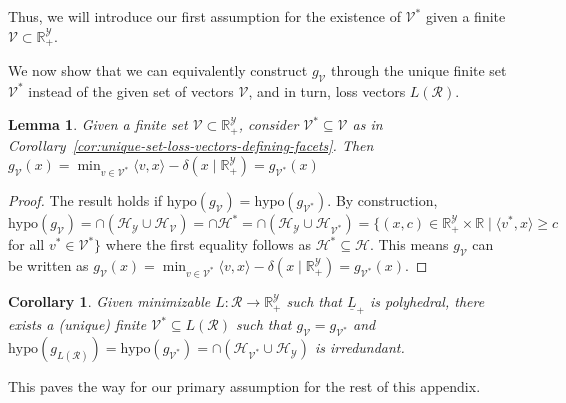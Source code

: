 \documentclass[11pt]{article}
\newcommand{\reals}{\mathbb{R}}
\renewcommand{\H}{\mathcal{H}}
\newcommand{\R}{\mathcal{R}}
\newcommand{\V}{\mathcal{V}}
\newcommand{\Y}{\mathcal{Y}}
\newcommand{\risk}[1]{\underline{#1}}
\newcommand{\inprod}[2]{\langle #1, #2 \rangle}%
\newcommand{\hyp}{\mathrm{hypo}}
\newtheorem{lemma}{Lemma}
\newtheorem{corollary}{Corollary}
\newtheorem{assumption}{Assumption}
\begin{document}
Thus, we will introduce our first assumption for the existence of $\V^*$ given a finite $\V \subset \reals^\Y_+$.

%


We now show that we can equivalently construct $g_\V$ through the unique finite set $\V^*$ instead of the given set of vectors $\V$, and in turn, loss vectors $L(\R)$.
\begin{lemma}\label{claim:g-gen-by-Vstar}
	Given a finite set $\V \subset \reals^\Y_+$, consider $\V^* \subseteq \V$ as in Corollary~\ref{cor:unique-set-loss-vectors-defining-facets}.
  Then $g_\V(x) = \min_{v \in \V^*}\inprod{v}{x} - \delta(x \mid \reals_+^\Y) = g_{\V^*}(x)$
\end{lemma}
\begin{proof}
  The result holds if $\hyp(g_\V) = \hyp(g_{\V^*})$.
  By construction, $\hyp(g_\V) = \cap (\H_\Y \cup \H_\V)= \cap \H^* = \cap (\H_\Y \cup \H_{\V^*}) = \{(x,c) \in \reals_+^\Y \times \reals \mid \inprod{v^*}{x} \geq c$ for all $v^* \in \V^* \}$ where the first equality follows as $\H^* \subseteq \H$.
  This means $g_\V$ can be written as $g_\V(x) = \min_{v \in \V^*}\inprod{v}{x} - \delta(x \mid \reals^\Y_+) = g_{\V^*}(x)$. 
\end{proof}


\begin{corollary}
	Given minimizable $L : \R \to \reals^\Y_+$ such that $\risk L_+$ is polyhedral, there exists a (unique) finite $\V^* \subseteq L(\R)$ such that $g_\V = g_{\V^*}$ and $\hyp(g_{L(\R)}) = \hyp(g_{\V^*}) = \cap(\H_{\V^*} \cup \H_\Y)$ is irredundant.
\end{corollary}

This paves the way for our primary assumption for the rest of this appendix.
\end{document}
